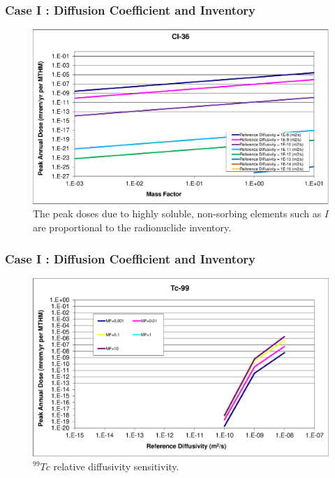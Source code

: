 \begin{frame}[c]
  \frametitle{Case I : Diffusion Coefficient and Inventory}

\begin{figure}[ht]
\centering
\includegraphics[width=\linewidth]{DiffCoeffAndInvEBSFail/Cl-36-MF.eps}
\caption{The peak doses due to highly soluble, non-sorbing elements such as $I$ 
are  proportional to the radionuclide inventory.}
\label{fig:DCInvCl36MF}
\end{figure}
\end{frame}


\begin{frame}[c]
  \frametitle{Case I : Diffusion Coefficient and Inventory}
\begin{figure}[ht!]
\centering
\includegraphics[width=\linewidth]{DiffCoeffAndInvEBSFail/Tc-99.eps}
\caption{$^{99}Tc$ relative diffusivity sensitivity.} 
\label{fig:DCInvTc99}
\end{figure}
\end{frame}

